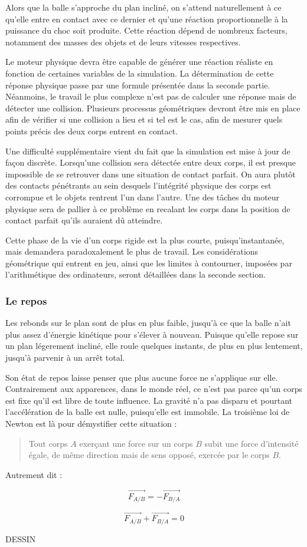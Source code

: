 Alors que la balle s'approche du plan incliné, on s'attend naturellement à ce qu'elle entre en contact avec ce dernier et qu'une réaction proportionnelle à la puissance du choc soit produite. Cette réaction dépend de nombreux facteurs, notamment des masses des objets et de leurs vitesses respectives.

Le moteur physique devra être capable de générer une réaction réaliste en fonction de certaines variables de la simulation. La détermination de cette réponse physique passe par une formule présentée dans la seconde partie. Néanmoins, le travail le plus complexe n'est pas de calculer une réponse mais de détecter une collision. Plusieurs processus géométriques devront être mis en place afin de vérifier si une collision a lieu et si tel est le cas, afin de mesurer quels points précis des deux corps entrent en contact.

Une difficulté supplémentaire vient du fait que la simulation est mise à jour de façon discrète. Lorsqu'une collision sera détectée entre deux corps, il est presque impossible de se retrouver dans une situation de contact parfait. On aura plutôt des contacts pénétrants au sein desquels l'intégrité physique des corps est corrompue et le objets rentrent l'un dans l'autre. Une des tâches du moteur physique sera de pallier à ce problème en recalant les corps dans la position de contact parfait qu'ils auraient dû atteindre.

Cette phase de la vie d'un corps rigide est la plus courte, puisqu'instantanée, mais demandera paradoxalement le plus de travail. Les considérations géométrique qui entrent en jeu, ainsi que les limites à contourner, imposées par l'arithmétique des ordinateurs, seront détaillées dans la seconde section.

\subsubsection{Le repos}

Les rebonds sur le plan sont de plus en plus faible, jusqu'à ce que la balle n'ait plus assez d'énergie kinétique pour s'élever à nouveau. Puisque qu'elle repose sur un plan légerement incliné, elle roule quelques instants, de plus en plus lentement, jusqu'à parvenir à un arrêt total.

Son état de repos laisse penser que plus aucune force ne s'applique sur elle. Contrairement aux apparences, dans le monde réel, ce n'est pas parce qu'un corps est fixe qu'il est libre de toute influence. La gravité n'a pas disparu et pourtant l'accélération de la balle est nulle, puisqu'elle est immobile. La troisième loi de Newton est là pour démystifier cette situation :

\begin{quote}
Tout corps $A$ exerçant une force sur un corps $B$ subit une force d'intensité égale, de même direction mais de sens opposé, exercée par le corps $B$.
\end{quote}

Autrement dit :

\[
\vec{F_{A/B}} = -\vec{F_{B/A}}
\]

\[
\vec{F_{A/B}} + \vec{F_{B/A}} = 0
\]

DESSIN
